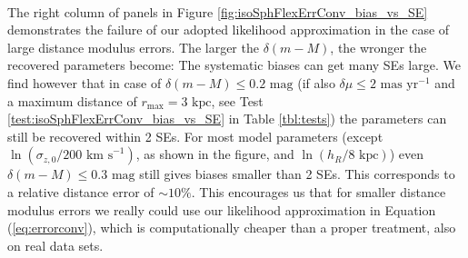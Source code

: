 \\The right column of panels in Figure \ref{fig:isoSphFlexErrConv_bias_vs_SE} demonstrates the failure of our adopted likelihood approximation in the case of large distance modulus errors. The larger the $\delta(m-M)$, the wronger the recovered parameters become: The systematic biases can get many SEs large. We find however that in case of $\delta(m-M) \leq 0.2 \text{ mag}$ (if also $\delta \mu \leq 2 \text{ mas yr}^{-1}$ and a maximum distance of $r_\text{max} = 3 \text{ kpc}$, see Test \ref{test:isoSphFlexErrConv_bias_vs_SE} in Table \ref{tbl:tests}) the parameters can still be recovered within 2 SEs. For most model parameters (except $\ln(\sigma_{z,0} / 200\text{ km s}^{-1})$, as shown in the figure, and $\ln(h_R/ 8\text{ kpc})$) even $\delta(m-M) \leq 0.3 \text{ mag}$ still gives biases smaller than 2 SEs. This corresponds to a relative distance error of $\sim10\%$. This encourages us that for smaller distance modulus errors we really could use our likelihood approximation in Equation (\ref{eq:errorconv}), which is computationally cheaper than a proper treatment, also on real data sets.



